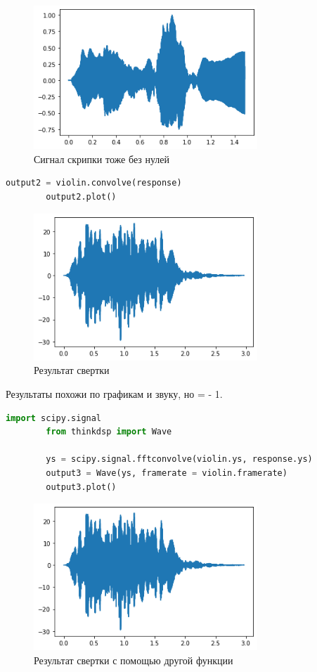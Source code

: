 \documentclass[a4paper, 12pt]{report}
\begin{document}
	\begin{figure}[H]
		\centering
		\includegraphics[width=0.75\textwidth]{task6.png}
		\caption{Сигнал скрипки тоже без нулей}
		\label{fig:task6}
	\end{figure}
	\begin{lstlisting}[language=Python,caption=Свертка сигнала скрипки]
		output2 = violin.convolve(response)
		output2.plot()
	\end{lstlisting}
	\begin{figure}[H]
		\centering
		\includegraphics[width=0.75\textwidth]{task7.png}
		\caption{Результат свертки}
		\label{fig:task7}
	\end{figure}
	Результаты похожи по графикам и звуку, но  =  - 1. 
	\begin{lstlisting}[language=Python,caption=Свертка сигнала скрипки с помощью FFT]
		import scipy.signal
		from thinkdsp import Wave

		ys = scipy.signal.fftconvolve(violin.ys, response.ys)
		output3 = Wave(ys, framerate = violin.framerate)
		output3.plot()
	\end{lstlisting}
	\begin{figure}[H]
		\centering
		\includegraphics[width=0.75\textwidth]{task8.png}
		\caption{Результат свертки с помощью другой функции}
		\label{fig:task8}
	\end{figure}
\end{document}
